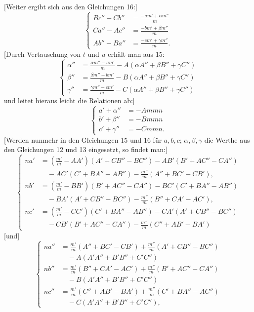 %
[Weiter ergibt sich aus den Gleichungen 16:]
\begin{equation}\tag*{[19]}
\left\{\begin{aligned}
Bc''-Cb''&=\frac{-am'+\alpha m''}{m}\\
Ca''-Ac''&=\frac{-bm'+\beta m''}{m}\\
Ab''-Ba''&=\frac{-cm'+\gamma m''}{m}.
\end{aligned}\right.
\end{equation}
[Durch Vertauschung von $t$ und $u$ erhält man aus 15:
\[
\left\{\begin{aligned}
\alpha''&=\frac{\alpha m''-am'}{m}-A(\alpha A''+\beta B''+\gamma C'')\\
\beta''&=\frac{\beta m''-bm'}{m}-B(\alpha A''+\beta B''+\gamma C'')\\
\gamma''&=\frac{\gamma m''-cm'}{m}-C(\alpha A''+\beta B''+\gamma C'')
\end{aligned}\right.
\]
und leitet hieraus leicht die Relationen ab:]
\begin{equation}\tag*{[20]}
\left\{\begin{aligned}
a'+\alpha''&=-Ammn\\
b'+\beta''&=-Bmmn\\
c'+\gamma''&=-Cmmn.
\end{aligned}\right.
\end{equation}
[Werden nunmehr in den Gleichungen 15 und 16 für $a,b,c$; $\alpha,\beta,\gamma$ die Werthe aus den Gleichungen 12 und 13 eingesetzt, so findet man:]
\begin{equation}\tag*{[21]}
\left\{\begin{aligned}
na'&=\left(\frac{m'}m-AA'\right)(A'+CB''-BC'')-AB'(B'+AC''-CA'')\\
&\quad-AC'(C'+BA''-AB'')-\frac{m''}m(A''+BC'-CB'),\\[4pt]
nb'&=\left(\frac{m'}m-BB'\right)(B'+AC''-CA'')-BC'(C'+BA''-AB'')\\
&\quad-BA'(A'+CB''-BC'')-\frac{m''}m(B''+CA'-AC'),\\[4pt]
nc'&=\left(\frac{m'}m-CC'\right)(C'+BA''-AB'')-CA'(A'+CB''-BC'')\\
&\quad-CB'(B'+AC''-CA'')-\frac{m''}m(C''+AB'-BA')
\end{aligned}\right.
\end{equation}
[und]
\begin{equation}\tag*{[22]}
\left\{\begin{aligned}
na''&=\frac{m'}m(A''+BC'-CB')+\frac{m''}m(A'+CB''-BC'')\\
&\quad-A(A'A''+B'B''+C'C'')\\[4pt]
nb''&=\frac{m'}m(B''+CA'-AC')+\frac{m''}m(B'+AC''-CA'')\\
&\quad-B(A'A''+B'B''+C'C'')\\[4pt]
nc''&=\frac{m'}m(C''+AB'-BA')+\frac{m''}m(C'+BA''-AC'')\\
&\quad-C(A'A''+B'B''+C'C''),
\end{aligned}\right.
\end{equation}

